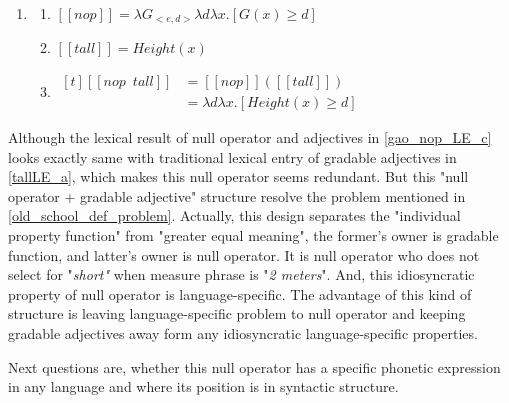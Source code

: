 \documentclass{ctexart}
\begin{document}
\begin{enumerate}[resume]
    \item \label{gao_nop_LE}

    \begin{enumerate}[ref=(\arabic{enumi}\alph*)]
        \item \label{gao_nop_LE_a} 
        $[\![nop]\!]=\lambda G_{<e,d>}\lambda d \lambda x.[G(x) \geq d]$

        \item \label{gao_nop_LE_b} 
        $[\![tall]\!]=Height(x)$

        \item \label{gao_nop_LE_c} 
        $\begin{aligned}[t]
            [\![nop \enspace tall]\!] &= [\![nop]\!]([\![tall]\!]) \\
            &= \lambda d \lambda x.[Height(x) \geq d]
        \end{aligned}$

    \end{enumerate}
\end{enumerate}

Although the lexical result of null operator and adjectives in \ref{gao_nop_LE_c} looks exactly same with traditional lexical entry of gradable adjectives in \ref{tallLE_a}, which makes this null operator seems redundant. But this "null operator + gradable adjective" structure resolve the problem mentioned in \ref{old_school_def_problem}. Actually, this design separates the "individual property function" from "greater equal meaning", the former's owner is gradable function, and latter's owner is null operator. It is null operator who does not select for "\textit{short"} when measure phrase is "\textit{2 meters}". And, this idiosyncratic property of null operator is language-specific. The advantage of this kind of structure is leaving language-specific problem to null operator and keeping gradable adjectives away form any idiosyncratic language-specific properties.

Next questions are, whether this null operator has a specific phonetic expression in any language and where its position is in syntactic structure. 
\end{document}
